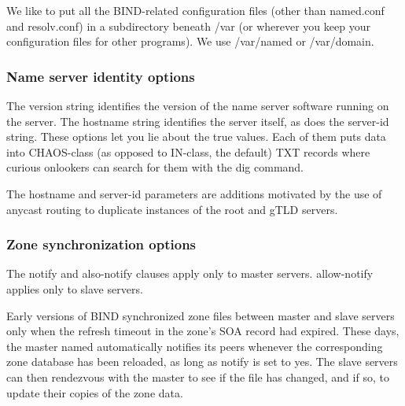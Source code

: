 We like to put all the BIND-related configuration files (other than
{named.conf} and {resolv.conf}) in a subdirectory beneath {/var} (or
wherever you keep your configuration files for other programs). We use
{/var/named} or {/var/domain}.

\subsubsection{Name server identity options}


\protect\hypertarget{part0024_split_037.htmlux5cux23_idTextAnchor899}{}{}The
\protect\hypertarget{part0024_split_037.htmlux5cux23_idIndexMarker2123}{}{}{version}
string identifies the version of the name server software running on the
server. The {hostname} string identifies the server itself, as does the
{server-id} string. These options let you lie about the true values.
Each of them puts data into CHAOS-class (as opposed to IN-class, the
default) TXT records where curious onlookers can search for them with
the {dig} command.

The
\protect\hypertarget{part0024_split_037.htmlux5cux23_idIndexMarker2124}{}{}{hostname}
and
\protect\hypertarget{part0024_split_037.htmlux5cux23_idIndexMarker2125}{}{}{server-id}
parameters are additions motivated by the use of
\protect\hypertarget{part0024_split_037.htmlux5cux23_idIndexMarker2126}{}{}anycast
routing to duplicate instances of the root and gTLD servers.

\subsubsection{Zone synchronization options}


The
\protect\hypertarget{part0024_split_037.htmlux5cux23_idIndexMarker2127}{}{}{notify}
and
\protect\hypertarget{part0024_split_037.htmlux5cux23_idIndexMarker2128}{}{}{also-notify}
clauses apply only to master servers. {allow-notify} applies only to
slave servers.

Early versions of BIND synchronized zone files between master and slave
servers only when the refresh timeout in the zone's SOA record had
expired. These days, the master {named} automatically notifies its peers
whenever the corresponding zone database has been reloaded, as long as
{notify} is set to {yes}. The slave servers can then rendezvous with the
master to see if the file has changed, and if so, to update their copies
of the zone data.

